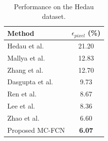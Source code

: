 \begin{table}
	\centering 
	\begin{tabular}{lc}
		\toprule
		Method & $\epsilon_{pixel}$ (\%) \\
		\midrule
		Hedau et al.~\cite{hedau2009recovering} & 21.20 \\
		Mallya et al.~\cite{mallya2015learning} & 12.83 \\
		Zhang et al.~\cite{zhang2017learning} & 12.70 \\
		Dasgupta et al.~\cite{dasgupta2016delay} & 9.73 \\
		Ren et al.~\cite{ren2016coarse} & 8.67 \\
		Lee et al.~\cite{LeeRoomNet17} & 8.36 \\
		Zhao et al.~\cite{zhao2017physics} & 6.60 \\
		\midrule
		Proposed MC-FCN & \textbf{6.07} \\
		\bottomrule
	\end{tabular}
	\caption{Performance on the Hedau dataset. }
	\label{table:comparison-hedau}
\end{table}



